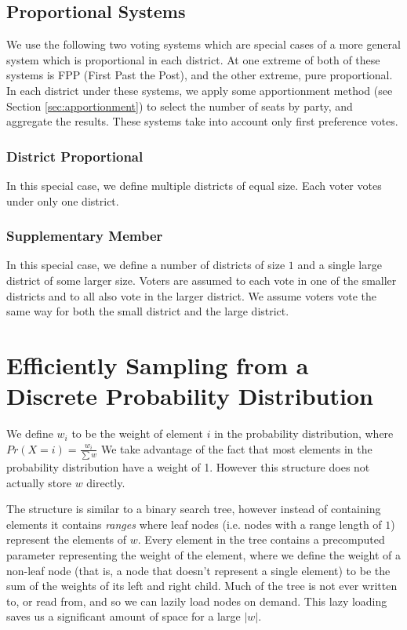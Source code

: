 \documentclass{article}
\begin{document}
\subsection{Proportional Systems}
We use the following two voting systems which are special cases of a more general system which is proportional in each district. At one extreme of both of these systems is FPP (First Past the Post), and the other extreme, pure proportional. In each district under these systems, we apply some apportionment method (see Section \ref{sec:apportionment}) to select the number of seats by party, and aggregate the results. These systems take into account only first preference votes.
\subsubsection{District Proportional}
\label{sec:dp}
In this special case, we define multiple districts of equal size. Each voter votes under only one district.
\subsubsection{Supplementary Member}
\label{sec:SM}
In this special case, we define a number of districts of size $1$ and a single large district of some larger size. Voters are assumed to each vote in one of the smaller districts and to all also vote in the larger district. We assume voters vote the same way for both the small district and the large district.

\section{Efficiently Sampling from a Discrete Probability Distribution}
\label{sec:efficientsampling}
We define $w_i$ to be the weight of element $i$ in the probability distribution, where $Pr(X=i)=\frac{w_i}{\sum w}$
We take advantage of the fact that most elements in the probability distribution have a weight of 1. However this structure does not actually store $w$ directly.

The structure is similar to a binary search tree, however instead of containing elements it contains \emph{ranges} where leaf nodes (i.e. nodes with a range length of $1$) represent the elements of $w$. Every element in the tree contains a precomputed parameter representing the weight of the element, where we define the weight of a non-leaf node (that is, a node that doesn't represent a single element) to be the sum of the weights of its left and right child. Much of the tree is not ever written to, or read from, and so we can lazily load nodes on demand. This lazy loading saves us a significant amount of space for a large $|w|$.
\end{document}

